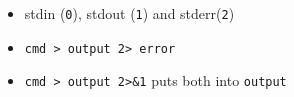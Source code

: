 \begin{itemize}
\item stdin (\texttt{0}), stdout (\texttt{1}) and stderr(\texttt{2})
\item \texttt{cmd \textgreater{} output 2\textgreater{} error}
\item \texttt{cmd \textgreater{} output 2\textgreater{}\&1} puts both
  into \texttt{output}
\end{itemize}
